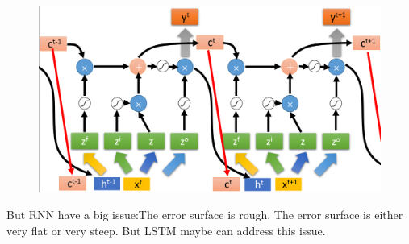 \documentclass{article}
\begin{document}
\begin{figure}[htbp]
  \centering
  \includegraphics[scale=0.5]{pic/lstm.png}
  \label{fig:my_label}
\end{figure}

But RNN have a big issue:The error surface is rough. The error surface is either very flat or very steep. But LSTM maybe can address this issue.

\section{}
\end{document}
